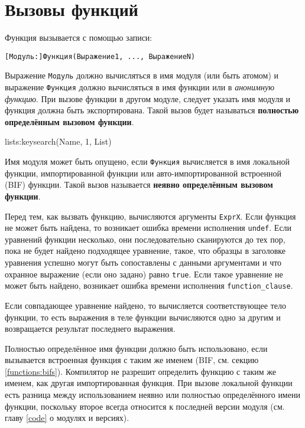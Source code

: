 \newpage
\section{Вызовы функций}
Функция вызывается с помощью записи:

\begin{verbatim}
[Модуль:]Функция(Выражение1, ..., ВыражениеN)
\end{verbatim}

Выражение \texttt{Модуль} должно вычисляться в имя модуля (или быть атомом) и
выражение \texttt{Функция} должно вычисляться в имя функции или в 
\emph{анонимную функцию}. При вызове функции в другом модуле, следует указать 
имя модуля и функция должна быть экспортирована. Такой вызов будет называться
\textbf{полностью определённым вызовом функции}.

\begin{erlang}
lists:keysearch(Name, 1, List)
\end{erlang}

Имя модуля может быть опущено, если \texttt{Функция} вычисляется в имя локальной 
функции, импортированной функции или авто-импортированной встроенной (BIF) 
функции. Такой вызов называется \textbf{неявно определённым вызовом функции}.

Перед тем, как вызвать функцию, вычисляются аргументы \texttt{ExprX}.  Если функция
не может быть найдена, то возникает ошибка времени исполнения \texttt{undef}.
Если уравнений функции несколько, они последовательно сканируются до тех пор, пока
не будет найдено подходящее уравнение, такое, что образцы в заголовке уравнения
успешно могут быть сопоставлены с данными аргументами и что охранное выражение 
(если оно задано) равно \texttt{true}.  Если такое уравнение не может быть найдено,
возникает ошибка времени исполнения \texttt{function\_clause}.

Если совпадающее уравнение найдено, то вычисляется соответствующее тело функции,
то есть выражения в теле функции вычисляются одно за другим и возвращается 
результат последнего выражения.

Полностью определённое имя функции должно быть использовано, если вызывается 
встроенная функция с таким же именем (BIF, см. секцию \ref{functions:bifs}). 
Компилятор не разрешит определить функцию с таким же именем, как другая 
импортированная функция. При вызове локальной функции есть разница между 
использованием неявно или полностью определённого имени функции, поскольку второе
всегда относится к последней версии модуля (см. главу \ref{code} о модулях и 
версиях).


